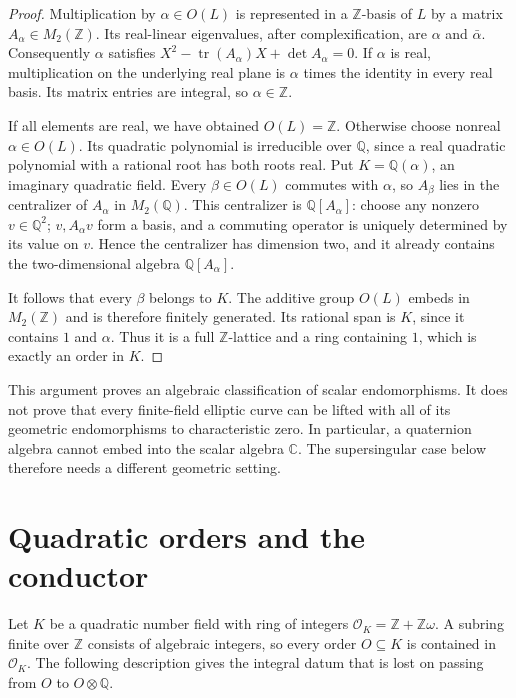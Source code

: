\begin{proof}
Multiplication by $\alpha\in O(L)$ is represented in a
$\mathbb Z$-basis of $L$ by a matrix $A_\alpha\in M_2(\mathbb Z)$.
Its real-linear eigenvalues, after complexification, are
$\alpha$ and $\bar\alpha$. Consequently
$\alpha$ satisfies
$X^2-\operatorname{tr}(A_\alpha)X+\det A_\alpha=0$.
If $\alpha$ is real, multiplication on the underlying real plane
is $\alpha$ times the identity in every real basis. Its matrix
entries are integral, so $\alpha\in\mathbb Z$.

If all elements are real, we have obtained $O(L)=\mathbb Z$.
Otherwise choose nonreal $\alpha\in O(L)$. Its quadratic
polynomial is irreducible over $\mathbb Q$, since a real quadratic
polynomial with a rational root has both roots real. Put
$K=\mathbb Q(\alpha)$, an imaginary quadratic field. Every
$\beta\in O(L)$ commutes with $\alpha$, so $A_\beta$ lies in
the centralizer of $A_\alpha$ in $M_2(\mathbb Q)$. This
centralizer is $\mathbb Q[A_\alpha]$: choose any nonzero
$v\in\mathbb Q^2$; $v,A_\alpha v$ form a basis, and a
commuting operator is uniquely determined by its value on $v$.
Hence the centralizer has dimension two, and it already contains
the two-dimensional algebra $\mathbb Q[A_\alpha]$.

It follows that every $\beta$ belongs to $K$. The additive group
$O(L)$ embeds in $M_2(\mathbb Z)$ and is therefore finitely
generated. Its rational span is $K$, since it contains $1$ and
$\alpha$. Thus it is a full $\mathbb Z$-lattice and a ring
containing $1$, which is exactly an order in $K$.
\end{proof}

This argument proves an algebraic classification of scalar
endomorphisms. It does not prove that every finite-field elliptic
curve can be lifted with all of its geometric endomorphisms to
characteristic zero. In particular, a quaternion algebra cannot
embed into the scalar algebra $\mathbb C$. The supersingular
case below therefore needs a different geometric setting.

\section{Quadratic orders and the conductor}

Let $K$ be a quadratic number field with ring of integers
$\mathcal O_K=\mathbb Z+\mathbb Z\omega$. A subring finite over
$\mathbb Z$ consists of algebraic integers, so every order
$O\subseteq K$ is contained in $\mathcal O_K$. The following
description gives the integral datum that is lost on passing from
$O$ to $O\otimes\mathbb Q$.

